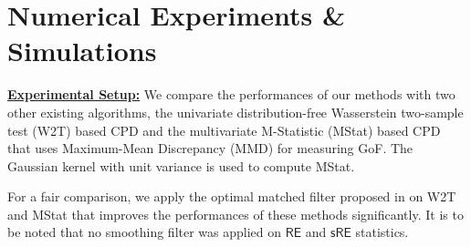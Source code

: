 \documentclass{article}
\begin{document}
\section{Numerical Experiments \& Simulations}
\label{sec:evaluation}


\textbf{\underline{Experimental Setup:}} We compare the performances of our methods with two other existing algorithms, the univariate distribution-free Wasserstein two-sample test (W2T) \cite{cheng2020optimal} based CPD and the multivariate M-Statistic (MStat) \cite{li2015scan} based CPD that uses Maximum-Mean Discrepancy (MMD) \cite{gretton2012kernel} for measuring GoF. The Gaussian kernel with unit variance is used to compute MStat. 

For a fair comparison, we apply the  optimal matched filter proposed in \cite{cheng2020optimal} on W2T and MStat that improves the performances of these methods significantly. It is to be noted that no smoothing filter was applied on {\small $\mathsf{RE}$} and {\small $\mathsf{sRE}$} statistics. 
\end{document}
